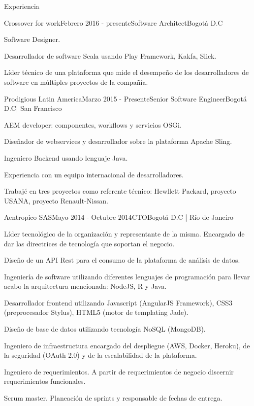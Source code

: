 \documentclass[spanish]{resume} %
\begin{document}
\begin{rSection}{Experiencia}

\begin{rSubsection}{Crossover for work}{Febrero 2016 - presente}{Software Architect}{Bogot\'a D.C}
\item Software Designer.
\item Desarrollador de software Scala usando Play Framework, Kakfa, Slick.
\item L\'ider t\'ecnico de una plataforma que mide el desempeño de los desarrolladores de software en m\'ultiples proyectos de la compa\~n\'ia.  

\end{rSubsection}


\begin{rSubsection}{Prodigious Latin America}{Marzo 2015 - Presente}{Senior Software Engineer}{Bogot\'a D.C| San Francisco}
\item AEM developer: componentes, workflows y servicios OSGi.
\item Diseñador de webservices y desarrollador sobre la plataforma Apache Sling.  
\item Ingeniero Backend usando lenguaje Java.
\item Experiencia con un equipo internacional de desarrolladores.
\item Trabajé en tres proyectos como referente técnico: Hewllett Packard, proyecto USANA, proyecto Renault-Nissan.
\end{rSubsection}


\begin{rSubsection}{Aentropico SAS}{Mayo 2014 - Octubre 2014}{CTO}{Bogot\'a D.C | R\'io de Janeiro}
\item L\'ider tecnol\'ogico de la organizaci\'on y representante de la misma. Encargado de dar las directrices de tecnolog\'ia que soportan el negocio.
\item Dise\~no de un API Rest para el consumo de la plataforma de an\'alisis de datos.
\item Ingenier\'ia de software utilizando diferentes lenguajes de programaci\'on para llevar acabo la arquitectura mencionada: NodeJS, R y Java.
\item Desarrollador frontend utilizando Javascript (AngularJS Framework), CSS3 (preprocesador Stylus), HTML5 (motor de templating Jade).
\item Dise\~no de base de datos utilizando tecnolog\'ia NoSQL (MongoDB).
\item Ingeniero de infraestructura encargado del despliegue (AWS, Docker, Heroku), de la seguridad (OAuth 2.0) y de la escalabilidad de la plataforma.
\item Ingeniero de requerimientos. A partir de requerimientos de negocio discernir requerimientos funcionales.
\item Scrum master. Planeaci\'on de sprints y responsable de fechas de entrega.
\end{rSubsection}


\end{rSection}
\end{document}

